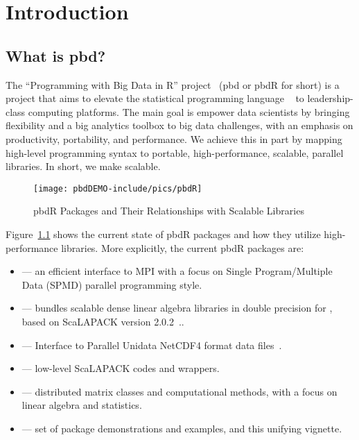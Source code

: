 \chapter[Introduction]{Introduction}
\label{sec:introduction}


\section{What is pbd?}

The ``Programming with Big Data in R'' project~\citep{pbdR2012} (pbd or pbdR for short) is a project that aims to elevate the statistical programming language ~\citep{Rcore} to leadership-class computing platforms.  The main goal is empower data scientists by bringing flexibility and a big analytics toolbox to big data challenges, with an emphasis on productivity, portability, and performance.  We achieve this in part by mapping high-level programming syntax to portable, high-performance, scalable, parallel libraries.  In short, we make  scalable.

\begin{figure}[t]
 \centering
 \texttt{[image: pbdDEMO-include/pics/pbdR]}
 \caption[pbdR Packages]{pbdR Packages and Their Relationships with Scalable Libraries}
 \label{fig:pbdrpackages}
\end{figure}
Figure~\ref{fig:pbdrpackages} shows the current state of pbdR packages and how they utilize high-performance libraries.  More explicitly, the current pbdR packages are:

\begin{itemize}
 \item {} --- an efficient interface to MPI with a focus on Single Program/Multiple Data (SPMD) parallel programming style.
 \item {} --- bundles scalable dense linear algebra libraries in double precision for , based on ScaLAPACK version 2.0.2~\citep{slug}..
 \item {} --- Interface to Parallel Unidata NetCDF4 format data files~\citep{netcdf}.
 \item {} --- low-level ScaLAPACK codes and wrappers.
 \item {} --- distributed matrix classes and computational methods, with a focus on linear algebra and statistics.
 \item {} --- set of package demonstrations and examples, and this unifying vignette.
\end{itemize}


